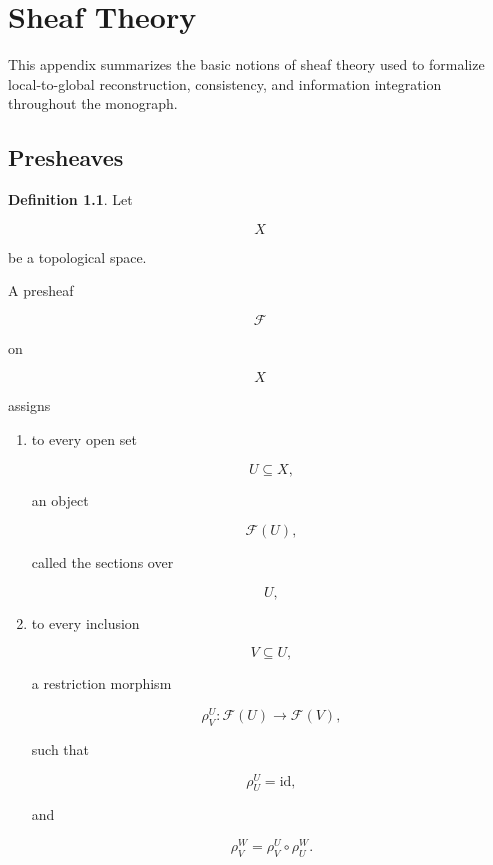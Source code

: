 \documentclass[11pt]{book}
\numberwithin{equation}{chapter}
\theoremstyle{definition}
\newtheorem{definition}{Definition}[chapter]
\theoremstyle{plain}
\begin{document}
\chapter{Sheaf Theory}

This appendix summarizes the basic notions of sheaf theory used to
formalize local-to-global reconstruction, consistency, and information
integration throughout the monograph.


\section{Presheaves}

\begin{definition}

Let

\[
X
\]

be a topological space.

A presheaf

\[
\mathcal F
\]

on

\[
X
\]

assigns

\begin{enumerate}

\item
to every open set

\[
U\subseteq X,
\]

an object

\[
\mathcal F(U),
\]

called the sections over

\[
U,
\]

\item
to every inclusion

\[
V\subseteq U,
\]

a restriction morphism

\[
\rho^U_V:
\mathcal F(U)
\rightarrow
\mathcal F(V),
\]

such that

\[
\rho^U_U=\mathrm{id},
\]

and

\[
\rho^W_V
=
\rho^U_V
\circ
\rho^W_U.
\]

\end{enumerate}

\end{definition}

\end{document}
